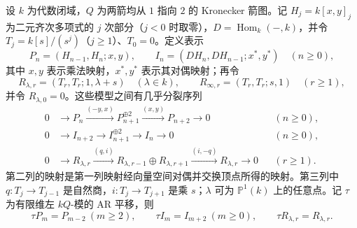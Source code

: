 \begin{proposition}\label{b5:prop:kronecker-almost-split}
	设 \(k\) 为代数闭域，\(Q\) 为两箭均从 \(1\) 指向 \(2\) 的 Kronecker 箭图。记 \(H_j=k[x,y]_j\) 为二元齐次多项式的 \(j\) 次部分（\(j<0\) 时取零），\(D=\operatorname{Hom}_k(-,k)\)，并令 \(T_j=k[s]/(s^j)\)（\(j\ge1\)）、\(T_0=0\)。定义表示
	\[
		P_n=(H_{n-1},H_n;x,y),\qquad
		I_n=(DH_n,DH_{n-1};x^*,y^*)\quad(n\ge0),
	\]
	其中 \(x,y\) 表示乘法映射，\(x^*,y^*\) 表示其对偶映射；再令
	\[
		R_{\lambda,r}=(T_r,T_r;1,\lambda+s)\quad(\lambda\in k),\qquad
		R_{\infty,r}=(T_r,T_r;s,1)\quad(r\ge1),
	\]
	并令 \(R_{\lambda,0}=0\)。这些模型之间有几乎分裂序列
	\begin{align}
		0&\longrightarrow P_n\xrightarrow{(-y,x)}P_{n+1}^{\oplus2}
		\xrightarrow{(x,y)}P_{n+2}\longrightarrow0 &&(n\ge0),\label{b5:eq:kronecker-preprojective-ar}\\
		0&\longrightarrow I_{n+2}\longrightarrow I_{n+1}^{\oplus2}
		\longrightarrow I_n\longrightarrow0 &&(n\ge0),\label{b5:eq:kronecker-preinjective-ar}\\
		0&\longrightarrow R_{\lambda,r}\xrightarrow{(q,i)}
		R_{\lambda,r-1}\oplus R_{\lambda,r+1}
		\xrightarrow{(i,-q)}R_{\lambda,r}\longrightarrow0
		&&(r\ge1).\label{b5:eq:kronecker-regular-ar}
	\end{align}
	第二列的映射是第一列映射经向量空间对偶并交换顶点所得的映射。第三列中 \(q:T_j\to T_{j-1}\) 是自然商，\(i:T_j\to T_{j+1}\) 是乘 \(s\)；\(\lambda\) 可为 \(\mathbb P^1(k)\) 上的任意点。记 \(\tau\) 为有限维左 \(kQ\)-模的 AR 平移，则
	\[
		\tau P_m=P_{m-2}\ (m\ge2),\qquad
		\tau I_m=I_{m+2}\ (m\ge0),\qquad
		\tau R_{\lambda,r}=R_{\lambda,r}.
	\]
\end{proposition}
